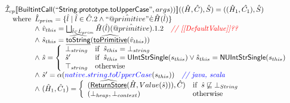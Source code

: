 \documentclass{article}
\makeatletter
\newcommand{\SF}[1]{\mbox{\textsf{#1}}}
\newcommand{\comment}[1]{\textit{#1}}
\newcommand{\wherec}[1]{{\rm where}\begin{array}[t]{l}#1\end{array}}
\newcommand{\ifc}[1]{{\rm if}\begin{array}[t]{l}#1\end{array}}
\newcommand{\owc}{{\rm otherwise}}
\newcommand{\aI}{\hat{\mathcal{I}}}
\newcommand{\lbr}{\llbracket}
\newcommand{\rbr}{\rrbracket}
\newcommand{\ahf}[1]{\widehat{\underline{\sf #1}}}
\newcommand{\avarprop}[1]{\hat{@#1}}
\def\inred{\color{red}}
\def\inblue{\color{blue}}
\def\inred{\color{red}}
\def\inblue{\color{blue}}
\makeatother
\begin{document}
\[
\begin{array}{l}

\aI _{cp}\lbr \SF{BuiltintCall}(``\SF{String.prototype.toUpperCase}",args))\rbr((\hat{H},\hat{C}), \hat{S})
  = ((\hat{H}_1, \hat{C_1}), \hat{S})\\
\quad\wherec{ 
  \hat{L}_{prim} = \{ \hat{l} \mid \hat{l} \in \hat{C}.2 \land ``\avarprop{primitive}" \dot{\in}\hat{H}(\hat{l}) \}\\
  \land\ \hat{v}_{this} = \bigsqcup_{\hat{l} \in \hat{L}_{prim}} \hat{H}(\hat{l})(\avarprop{primitive}).1.2
    \quad\comment{{\inred // [[DefaultValue]]??}}\\
  \land\ \hat{s}_{this} = \ahf{toString}(\ahf{toPrimitive}(\hat{v}_{this}))\\
  \land\ \hat{s} = \left\{\begin{array}{ll}
      \bot_{string} & \ifc{\hat{s}_{this} = \bot_{string}}\\
      \hat{s}' & \ifc{\hat{s}_{this} = \SF{UIntStrSingle}(s_{this}) \lor \hat{s}_{this} = \SF{NUIntStrSingle}(s_{this}) }\\
      \top_{string} & \owc
    \end{array}\right.\\
  \land\ \hat{s}' = \alpha({\inblue native.string.toUpperCase}(s_{this}))
    \quad\comment{{\inblue // java, scala}}\\  
  \land\ (\hat{H}_1, \hat{C}_1) = 
    \left\{\begin{array}{ll}
      (\ahf{ReturnStore}(\hat{H}, Value(\hat{s}))), \hat{C})
      & \ifc{\hat{s} \not\sqsubseteq \bot_{String}}\\
      (\bot_{heap}, \bot_{context}) & \owc \\
    \end{array}\right.\\
  }\\
\\\\



\end{array}\]
\end{document}
